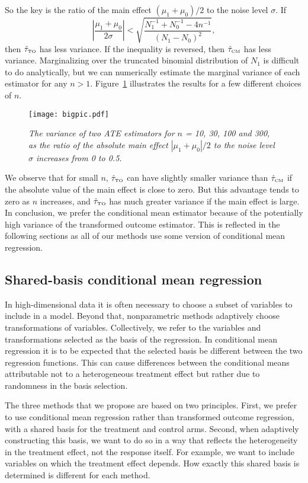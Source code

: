 \documentclass{article}
\def\tauCM{\hat\tau_{\mbox{\tiny CM}}}
\def\tauTO{\hat\tau_{\mbox{\tiny TO}}}
\begin{document}
So the key is the ratio of the main effect $(\mu_1 + \mu_0)/2$ to the noise
level $\sigma$. If
$$\left|\frac{\mu_1 + \mu_0}{2\sigma}\right| < \sqrt{\frac{N_1^{-1} +
  N_0^{-1} - 4n^{-1}}{(N_1 - N_0)^2}},$$
then $\tauTO$ has less variance. If the inequality is reversed,
then $\tauCM$ has less variance. Marginalizing over the truncated binomial
distribution of $N_1$ is difficult to do analytically, but we can numerically
estimate the marginal variance of each estimator for any $n > 1$.
Figure~\ref{fig-bigpic} illustrates the results for a few different choices of
$n$.

\begin{figure}
\caption{\it The variance of two ATE estimators for $n$ = 10, 30, 100 and 300,
 as the ratio of the absolute main effect $|\mu_1 + \mu_0|/2$ to the noise
 level $\sigma$ increases from 0 to 0.5.}
\label{fig-bigpic}
\centering
\texttt{[image: bigpic.pdf]}
\end{figure}

We observe that for small $n$, $\tauTO$ can have slightly smaller variance than
$\tauCM$ if the absolute value of the main effect is close to zero. But this
advantage tends to zero as $n$ increases, and
$\tauTO$ has much greater variance if the main effect is large. In conclusion,
we prefer the conditional mean estimator because of the potentially high
variance of the transformed outcome estimator. This is reflected in the
following sections as all of our methods use some version of conditional mean
regression.


\subsection{Shared-basis conditional mean regression}

In high-dimensional data it is often necessary to choose a subset of variables
to include in a model. Beyond that, nonparametric methods adaptively choose
transformations of variables. Collectively, we refer to the variables and
transformations selected as the basis of the regression. In conditional mean
regression it is to be expected that the selected basis be different between
the two regression functions. This can cause differences between the
conditional means attributable not to a heterogeneous treatment
effect but rather due to randomness in the basis selection.

The three methods that we propose are
based on two principles. First, we prefer to use conditional mean regression
rather than transformed outcome regression, with a shared basis for the
treatment and control arms. Second, when adaptively constructing this basis, we
want to do so in a way that reflects the heterogeneity in the treatment effect,
not the response itself. For example, we want to include variables on which the
treatment effect depends. How exactly this shared basis is determined is
different for each method.
\end{document}
